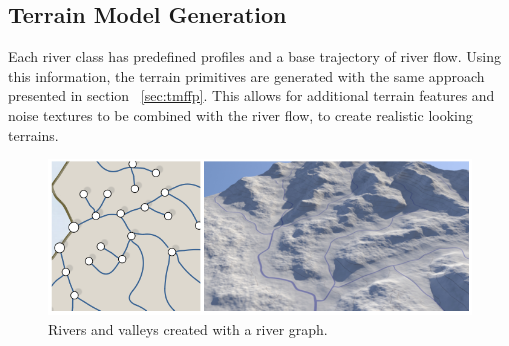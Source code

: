 \subsection{Terrain Model Generation}
Each river class has predefined profiles and a base trajectory of river flow. Using this information, the terrain primitives are generated with the same approach presented in section ~\ref{sec:tmffp}. This allows for additional terrain features and noise textures to be combined with the river flow, to create realistic looking terrains. 
\begin{figure}[htb]
	\centering
	\includegraphics[width=\linewidth]{GGG13/valleys_and_rivers}
	\caption{Rivers and valleys created with a river graph.}
	\label{fig:valleys}
\end{figure}
